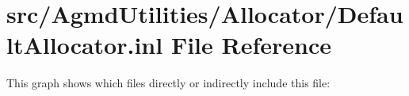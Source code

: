 \hypertarget{_default_allocator_8inl}{\section{src/\+Agmd\+Utilities/\+Allocator/\+Default\+Allocator.inl File Reference}
\label{_default_allocator_8inl}
}
This graph shows which files directly or indirectly include this file\+:
